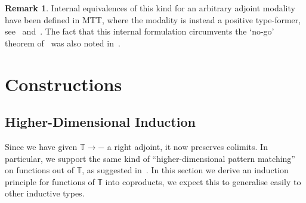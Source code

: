 \documentclass[10pt]{article}
\theoremstyle{definition}
\newtheorem{remark}[theorem]{Remark}
\newcommand{\Tiny}{\mathbb{T}}
\begin{document}
\begin{remark}
  Internal equivalences of this kind for an arbitrary adjoint modality
  have been defined in MTT, where the modality is instead a positive
  type-former, see~\cite[Proposition 3.4]{transpension}
  and~\cite[Section 10.4]{mtt}. The fact that this internal
  formulation circumvents the `no-go' theorem of~\cite{lops} was also
  noted in~\cite[Section 10.1]{transpension}.
\end{remark}

\section{Constructions}\label{sec:constructions}



\subsection{Higher-Dimensional Induction}\label{sec:induction}
Since we have given $\Tiny \to -$ a right adjoint, it now preserves
colimits. In particular, we support the same kind of
``higher-dimensional pattern matching'' on functions out of $\Tiny$,
as suggested in~\cite[\S 2.4]{transpension}. In this section we derive
an induction principle for functions of $\Tiny$ into coproducts, we
expect this to generalise easily to other inductive types.
\end{document}
